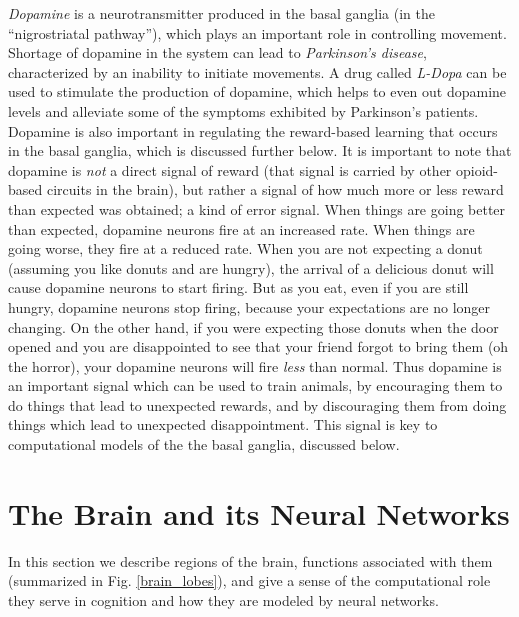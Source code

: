 \emph{Dopamine} is a neurotransmitter produced in the basal ganglia (in the ``nigrostriatal pathway''), which plays an important role in controlling movement. Shortage of dopamine in the system can lead to \emph{Parkinson's disease}, characterized by an inability to initiate movements. A drug called \emph{L-Dopa} can be used to stimulate the production of dopamine, which helps to even out dopamine levels and alleviate some of the symptoms exhibited by Parkinson's patients. Dopamine is also important in regulating the reward-based learning that occurs in the basal ganglia, which is discussed further below.  It is important to note that dopamine is \emph{not} a direct signal of reward (that signal is carried by other opioid-based circuits in the brain), but rather a signal of how much more or less reward than expected was obtained; a kind of error signal.  When things are going better than expected, dopamine neurons fire at an increased rate.  When things are going worse, they fire at a reduced rate. When you are not expecting a donut (assuming you like donuts and are hungry), the arrival of a delicious donut will cause dopamine neurons to start firing. But as you eat, even if you are still hungry, dopamine neurons stop firing, because your expectations are no longer changing.  On the other hand, if you were expecting those donuts when the door opened and you are disappointed to see that your friend forgot to bring them (oh the horror), your dopamine neurons will fire \emph{less} than normal. Thus dopamine is an important signal which can be used to train animals, by encouraging them to do things that lead to unexpected rewards, and by discouraging them from doing things which lead to unexpected disappointment. This signal is key to computational models of the  the basal ganglia, discussed below.

\section{The Brain and its Neural Networks}

In this section we describe regions of the brain, functions associated with them (summarized in Fig. \ref{brain_lobes}), and give a sense of the computational role they serve in cognition and how they are modeled by neural networks.

